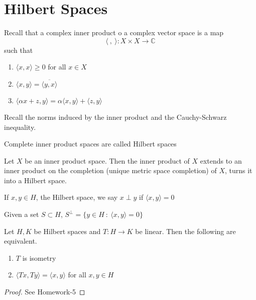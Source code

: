 
\chapter{Hilbert Spaces}

\begin{definition}
  Recall that a complex inner product o a complex vector space is a
  map \[
    \langle \ , \  \rangle : X \times X \to \mathbb{C}
  \]
  such that
  \begin{enumerate}[label=(\arabic*)]
    \item $\langle x , x \rangle \ge 0$ for all $x \in X$
    \item $\langle  x , y \rangle  = \overline{\langle y , x \rangle }$
    \item $\langle \alpha x + z, y \rangle  = \alpha \langle x , y
      \rangle  + \langle z , y \rangle $
  \end{enumerate}
\end{definition}

Recall the norms induced by the inner product and the Cauchy-Schwarz inequality.

\begin{definition}
  Complete inner product spaces are called Hilbert spaces
\end{definition}

\begin{proposition}
  Let $X$ be an inner product space. Then the inner product of $X$
  extends to an inner product on the completion (unique metric space
  completion) of $X$, turns it into
  a Hilbert space.
\end{proposition}

\begin{definition}
  If $x, y \in H$, the Hilbert space, we say $x \perp y$ if $ \langle
  x , y \rangle  = 0$
\end{definition}

\begin{definition}
  Given a set $S \subset H$, $S^\perp = \{ y \in H  \ : \  \langle x
  , y \rangle  = 0 \}$
\end{definition}

\begin{proposition}
  Let $H, K$ be Hilbert spaces and $T: H \to K$ be linear. Then the
  following are equivalent.
  \begin{enumerate}[label=(\arabic*)]
    \item $T$ is isometry
    \item $\langle  Tx , Ty \rangle = \langle x , y \rangle $ for all
      $x, y \in H$
  \end{enumerate}
\end{proposition}
\begin{proof}
  See Homework-5
\end{proof}

